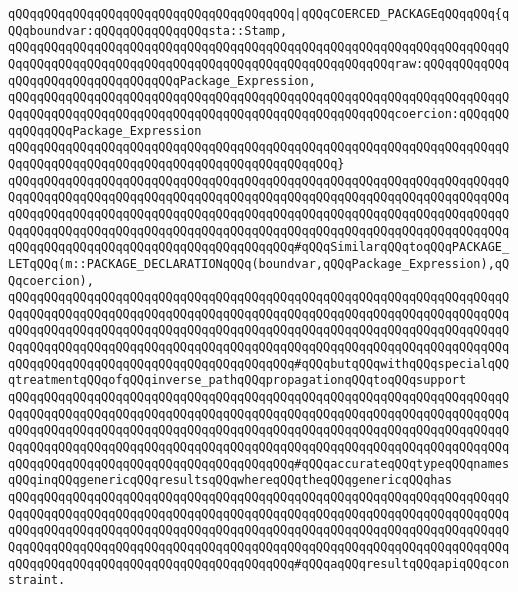 \verb|qQQqqQQqqQQqqQQqqQQqqQQqqQQqqQQqqQQqqQQq|\verb#|qQQqCOERCED_PACKAGEqQQqqQQq{qQQqboundvar:qQQqqQQqqQQqqQQqsta::Stamp,#\newline
\verb|qQQqqQQqqQQqqQQqqQQqqQQqqQQqqQQqqQQqqQQqqQQqqQQqqQQqqQQqqQQqqQQqqQQqqQQqqQQqqQQqqQQqqQQqqQQqqQQqqQQqqQQqqQQqqQQqqQQqqQQqqQQqraw:qQQqqQQqqQQqqQQqqQQqqQQqqQQqqQQqqQQqPackage_Expression,|\newline
\verb|qQQqqQQqqQQqqQQqqQQqqQQqqQQqqQQqqQQqqQQqqQQqqQQqqQQqqQQqqQQqqQQqqQQqqQQqqQQqqQQqqQQqqQQqqQQqqQQqqQQqqQQqqQQqqQQqqQQqqQQqqQQqcoercion:qQQqqQQqqQQqqQQqPackage_Expression|\newline
\verb|qQQqqQQqqQQqqQQqqQQqqQQqqQQqqQQqqQQqqQQqqQQqqQQqqQQqqQQqqQQqqQQqqQQqqQQqqQQqqQQqqQQqqQQqqQQqqQQqqQQqqQQqqQQqqQQqqQQq}|\newline
\verb|qQQqqQQqqQQqqQQqqQQqqQQqqQQqqQQqqQQqqQQqqQQqqQQqqQQqqQQqqQQqqQQqqQQqqQQqqQQqqQQqqQQqqQQqqQQqqQQqqQQqqQQqqQQqqQQqqQQqqQQqqQQqqQQqqQQqqQQqqQQqqQQqqQQqqQQqqQQqqQQqqQQqqQQqqQQqqQQqqQQqqQQqqQQqqQQqqQQqqQQqqQQqqQQqqQQqqQQqqQQqqQQqqQQqqQQqqQQqqQQqqQQqqQQqqQQqqQQqqQQqqQQqqQQqqQQqqQQqqQQqqQQqqQQqqQQqqQQqqQQqqQQqqQQqqQQqqQQqqQQq#qQQqSimilarqQQqtoqQQqPACKAGE_LETqQQq(m::PACKAGE_DECLARATIONqQQq(boundvar,qQQqPackage_Expression),qQQqcoercion),|\newline
\verb|qQQqqQQqqQQqqQQqqQQqqQQqqQQqqQQqqQQqqQQqqQQqqQQqqQQqqQQqqQQqqQQqqQQqqQQqqQQqqQQqqQQqqQQqqQQqqQQqqQQqqQQqqQQqqQQqqQQqqQQqqQQqqQQqqQQqqQQqqQQqqQQqqQQqqQQqqQQqqQQqqQQqqQQqqQQqqQQqqQQqqQQqqQQqqQQqqQQqqQQqqQQqqQQqqQQqqQQqqQQqqQQqqQQqqQQqqQQqqQQqqQQqqQQqqQQqqQQqqQQqqQQqqQQqqQQqqQQqqQQqqQQqqQQqqQQqqQQqqQQqqQQqqQQqqQQqqQQqqQQq#qQQqbutqQQqwithqQQqspecialqQQqtreatmentqQQqofqQQqinverse_pathqQQqpropagationqQQqtoqQQqsupport|\newline
\verb|qQQqqQQqqQQqqQQqqQQqqQQqqQQqqQQqqQQqqQQqqQQqqQQqqQQqqQQqqQQqqQQqqQQqqQQqqQQqqQQqqQQqqQQqqQQqqQQqqQQqqQQqqQQqqQQqqQQqqQQqqQQqqQQqqQQqqQQqqQQqqQQqqQQqqQQqqQQqqQQqqQQqqQQqqQQqqQQqqQQqqQQqqQQqqQQqqQQqqQQqqQQqqQQqqQQqqQQqqQQqqQQqqQQqqQQqqQQqqQQqqQQqqQQqqQQqqQQqqQQqqQQqqQQqqQQqqQQqqQQqqQQqqQQqqQQqqQQqqQQqqQQqqQQqqQQqqQQqqQQq#qQQqaccurateqQQqtypeqQQqnamesqQQqinqQQqgenericqQQqresultsqQQqwhereqQQqtheqQQqgenericqQQqhas|\newline
\verb|qQQqqQQqqQQqqQQqqQQqqQQqqQQqqQQqqQQqqQQqqQQqqQQqqQQqqQQqqQQqqQQqqQQqqQQqqQQqqQQqqQQqqQQqqQQqqQQqqQQqqQQqqQQqqQQqqQQqqQQqqQQqqQQqqQQqqQQqqQQqqQQqqQQqqQQqqQQqqQQqqQQqqQQqqQQqqQQqqQQqqQQqqQQqqQQqqQQqqQQqqQQqqQQqqQQqqQQqqQQqqQQqqQQqqQQqqQQqqQQqqQQqqQQqqQQqqQQqqQQqqQQqqQQqqQQqqQQqqQQqqQQqqQQqqQQqqQQqqQQqqQQqqQQqqQQqqQQqqQQq#qQQqaqQQqresultqQQqapiqQQqconstraint.|\newline
